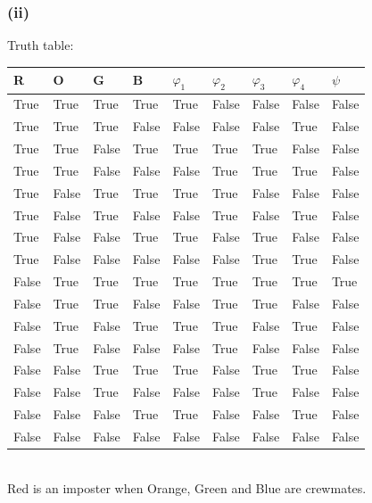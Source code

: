 \documentclass{article} %
\begin{document}
\subsubsection*{(ii)}
Truth table:\\
\begin{table}[h]
    \begin{tabular}{llll|llll|l}
            R & O & G & B & $\varphi_1$ &$\varphi_2$ & $\varphi_3$ & $\varphi_4$ & $\psi$ \\ \hline
            True  & True  & True  & True  & True  & False & False & False & False \\
            True  & True  & True  & False & False & False & False & True  & False \\
            True  & True  & False & True  & True  & True  & True  & False & False \\
            True  & True  & False & False & False & True  & True  & True  & False \\
            True  & False & True  & True  & True  & True  & False & False & False \\
            True  & False & True  & False & False & True  & False & True  & False \\
            True  & False & False & True  & True  & False & True  & False & False \\
            True  & False & False & False & False & False & True  & True  & False \\
            False & True  & True  & True  & True  & True  & True  & True  & True  \\
            False & True  & True  & False & False & True  & True  & False & False \\
            False & True  & False & True  & True  & True  & False & True  & False \\
            False & True  & False & False & False & True  & False & False & False \\
            False & False & True  & True  & True  & False & True  & True  & False \\
            False & False & True  & False & False & False & True  & False & False \\
            False & False & False & True  & True  & False & False & True  & False \\
            False & False & False & False & False & False & False & False & False
    \end{tabular}
\end{table}
\\
Red is an imposter when Orange, Green and Blue are crewmates.
\end{document}
